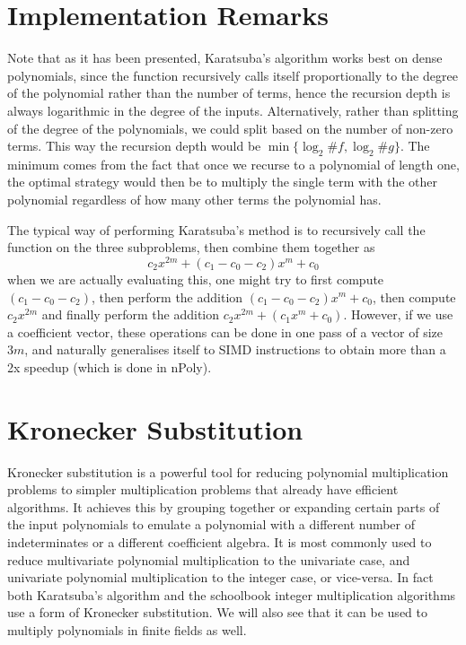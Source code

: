 \medskip

\section{Implementation Remarks}
    Note that as it has been presented, Karatsuba's algorithm works best on dense polynomials, since the function recursively calls itself proportionally to the degree of the polynomial rather than the number of terms, hence the recursion depth is always logarithmic in the degree of the inputs. Alternatively, rather than splitting of the degree of the polynomials, we could split based on the number of non-zero terms. This way the recursion depth would be $\min\{\log_2 \# f, \log_2 \# g\}$. The minimum comes from the fact that once we recurse to a polynomial of length one, the optimal strategy would then be to multiply the single term with the other polynomial regardless of how many other terms the polynomial has.

    The typical way of performing Karatsuba's method is to recursively call the function on the three subproblems, then combine them together as
    \[
        c_2x^{2m} + (c_1 - c_0 - c_2) x^m + c_0
    \]
    when we are actually evaluating this, one might try to first compute $(c_1 - c_0 - c_2)$, then perform the addition $(c_1 - c_0 - c_2)x^m + c_0$, then compute $c_2x^{2m}$ and finally perform the addition $c_2x^{2m} + (c_1x^m + c_0)$. However, if we use a coefficient vector, these operations can be done in one pass of a vector of size $3m$, and naturally generalises itself to SIMD instructions to obtain more than a 2x speedup (which is done in nPoly).

\medskip

\section{Kronecker Substitution}%
\label{sub:kronecker_substitution}

Kronecker substitution is a powerful tool for reducing polynomial multiplication problems to simpler multiplication problems that already have efficient algorithms. It achieves this by grouping together or expanding certain parts of the input polynomials to emulate a polynomial with a different number of indeterminates or a different coefficient algebra. It is most commonly used to reduce multivariate polynomial multiplication to the univariate case, and univariate polynomial multiplication to the integer case, or vice-versa. In fact both Karatsuba's algorithm and the schoolbook integer multiplication algorithms use a form of Kronecker substitution. We will also see that it can be used to multiply polynomials in finite fields as well. 

